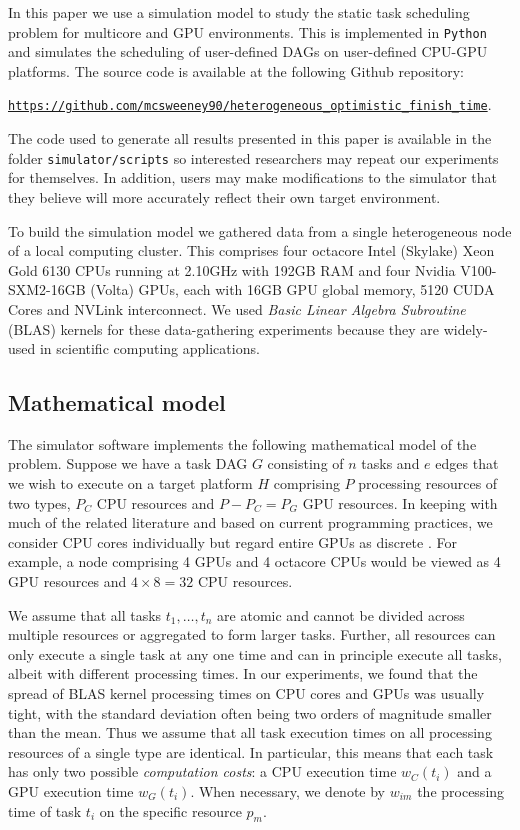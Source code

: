 \documentclass[runningheads]{llncs}
\begin{document}
In this paper we use a simulation model to study the static task scheduling problem for multicore and GPU environments. This is implemented in {\tt Python} and simulates the scheduling of user-defined DAGs on user-defined CPU-GPU platforms. The source code is available at the following Github repository: 
\begin{center}
	\href{https://github.com/mcsweeney90/heterogeneous_optimistic_finish_time}{{\tt \small https://github.com/mcsweeney90/heterogeneous\_optimistic\_finish\_time}}.
\end{center} 
The code used to generate all results presented in this paper is available in the folder {\tt simulator/scripts} so interested researchers may repeat our experiments for themselves. In addition, users may make modifications to the simulator that they believe will more accurately reflect their own target environment. 

To build the simulation model we gathered data from a single heterogeneous node of a local computing cluster. This comprises four octacore Intel (Skylake) Xeon Gold 6130 CPUs running at 2.10GHz with 192GB RAM and four Nvidia V100-SXM2-16GB (Volta) GPUs, each with 16GB GPU global memory, 5120 CUDA Cores and NVLink interconnect. We used {\em Basic Linear Algebra Subroutine} (BLAS) \cite{Dongarra:1990:SLB:77626.79170} kernels for these data-gathering experiments because they are widely-used in scientific computing applications.

\subsection{Mathematical model}
\label{subsect.mathematical_model}

The simulator software implements the following mathematical model of the problem. Suppose we have a task DAG $G$ consisting of $n$ tasks and $e$ edges that we wish to execute on a target platform $H$ comprising $P$ processing resources of two types, $P_C$ CPU resources and $P - P_C = P_G$ GPU resources. In keeping with much of the related literature and based on current programming practices, we consider CPU cores individually but regard entire GPUs as discrete \cite{agullo2016}. For example, a node comprising 4 GPUs and 4 octacore CPUs would be viewed as 4 GPU resources and $4 \times 8 = 32$ CPU resources.   

We assume that all tasks $t_1, \dots, t_n$ are atomic and cannot be divided across multiple resources or aggregated to form larger tasks. Further, all resources can only execute a single task at any one time and can in principle execute all tasks, albeit with different processing times. In our experiments, we found that the spread of BLAS kernel processing times on CPU cores and GPUs was usually tight, with the standard deviation often being two orders of magnitude smaller than the mean. Thus we assume that all task execution times on all processing resources of a single type are identical. In particular, this means that each task has only two possible {\em computation costs}: a CPU execution time $w_C(t_i)$ and a GPU execution time $w_G(t_i)$. When necessary, we denote by $w_{im}$ the processing time of task $t_i$ on the specific resource $p_m$.
\end{document}
